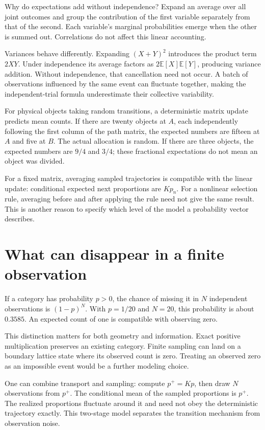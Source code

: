 \documentclass[11pt,oneside,openany]{book}
\theoremstyle{definition}
\theoremstyle{remark}
\numberwithin{equation}{chapter}
\begin{document}
Why do expectations add without independence? Expand an average over all joint outcomes and group the contribution of the first variable separately from that of the second. Each variable's marginal probabilities emerge when the other is summed out. Correlations do not affect this linear accounting.

Variances behave differently. Expanding \((X+Y)^2\) introduces the product term \(2XY\). Under independence its average factors as \(2\mathbb E[X]\mathbb E[Y]\), producing variance addition. Without independence, that cancellation need not occur. A batch of observations influenced by the same event can fluctuate together, making the independent-trial formula underestimate their collective variability.

For physical objects taking random transitions, a deterministic matrix update predicts mean counts. If there are twenty objects at \(A\), each independently following the first column of the path matrix, the expected numbers are fifteen at \(A\) and five at \(B\). The actual allocation is random. If there are three objects, the expected numbers are \(9/4\) and \(3/4\); these fractional expectations do not mean an object was divided.

For a fixed matrix, averaging sampled trajectories is compatible with the linear update: conditional expected next proportions are \(Kp_n\). For a nonlinear selection rule, averaging before and after applying the rule need not give the same result. This is another reason to specify which level of the model a probability vector describes.

\section{What can disappear in a finite observation}\label{ch04-what-can-disappear-in-a-finite-observation}

If a category has probability \(p>0\), the chance of missing it in \(N\) independent observations is \((1-p)^N\). With \(p=1/20\) and \(N=20\), this probability is about \(0.3585\). An expected count of one is compatible with observing zero.

This distinction matters for both geometry and information. Exact positive multiplication preserves an existing category. Finite sampling can land on a boundary lattice state where its observed count is zero. Treating an observed zero as an impossible event would be a further modeling choice.

One can combine transport and sampling: compute \(p^+=Kp\), then draw \(N\) observations from \(p^+\). The conditional mean of the sampled proportions is \(p^+\). The realized proportions fluctuate around it and need not obey the deterministic trajectory exactly. This two-stage model separates the transition mechanism from observation noise.
\end{document}
